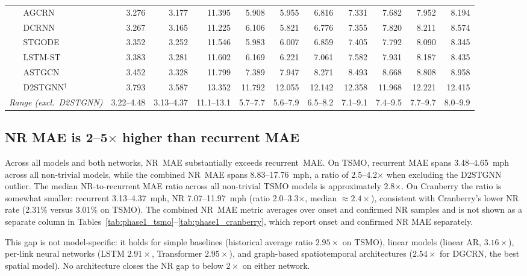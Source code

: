 \documentclass[a4paper]{cas-sc}
\begin{document}
\begin{table}[htbp]
{\begin{tabular}{ll r r r r | r r r r r r}
 & AGCRN            & 3.276 & 3.177 & 11.395 &  5.908 &  5.955 &  6.816 &  7.331 &  7.682 &  7.952 &  8.194 \\
 & DCRNN            & 3.267 & 3.165 & 11.225 &  6.106 &  5.821 &  6.776 &  7.355 &  7.820 &  8.211 &  8.574 \\
 & STGODE           & 3.352 & 3.252 & 11.546 &  5.983 &  6.007 &  6.859 &  7.405 &  7.792 &  8.090 &  8.345 \\
 & LSTM-ST          & 3.383 & 3.281 & 11.602 &  6.169 &  6.221 &  7.061 &  7.582 &  7.931 &  8.187 &  8.435 \\
 & ASTGCN           & 3.452 & 3.328 & 11.799 &  7.389 &  7.947 &  8.271 &  8.493 &  8.668 &  8.808 &  8.958 \\
 & D2STGNN$^\dagger$& 3.793 & 3.587 & 13.352 & 11.792 & 12.055 & 12.142 & 12.358 & 11.968 & 12.221 & 12.415 \\
\midrule
\multicolumn{2}{l}{\textit{Range (excl.\ D2STGNN)}} & 3.22--4.48 & 3.13--4.37 & 11.1--13.1 & 5.7--7.7 & 5.6--7.9 & 6.5--8.2 & 7.1--9.1 & 7.4--9.5 & 7.7--9.7 & 8.0--9.9 \\
\bottomrule
\end{tabular}}
\end{table}

\subsection{NR MAE is 2--5$\times$ higher than recurrent MAE}
\label{sec:finding1}

Across all models and both networks, NR~MAE substantially exceeds
recurrent~MAE.
On TSMO, recurrent MAE spans 3.48--4.65~mph across all non-trivial
models, while the combined NR~MAE spans 8.83--17.76~mph,
a ratio of 2.5--4.2$\times$ when excluding the D2STGNN outlier.
The median NR-to-recurrent MAE ratio across all non-trivial TSMO models
is approximately 2.8$\times$.
On Cranberry the ratio is somewhat smaller: recurrent 3.13--4.37~mph,
NR 7.07--11.97~mph (ratio 2.0--3.3$\times$, median $\approx 2.4\times$),
consistent with Cranberry's lower NR rate (2.31\% versus 3.01\% on TSMO).
The combined NR~MAE metric averages over onset and confirmed NR samples
and is not shown as a separate column in
Tables~\ref{tab:phase1_tsmo}--\ref{tab:phase1_cranberry},
which report onset and confirmed NR MAE separately.

This gap is not model-specific: it holds for simple baselines (historical
average ratio $2.95\times$ on TSMO), linear models (linear AR,
$3.16\times$), per-link neural networks (LSTM $2.91\times$, Transformer
$2.95\times$), and graph-based spatiotemporal architectures
($2.54\times$ for DGCRN, the best spatial model).
No architecture closes the NR gap to below $2\times$ on either network.
\end{document}
